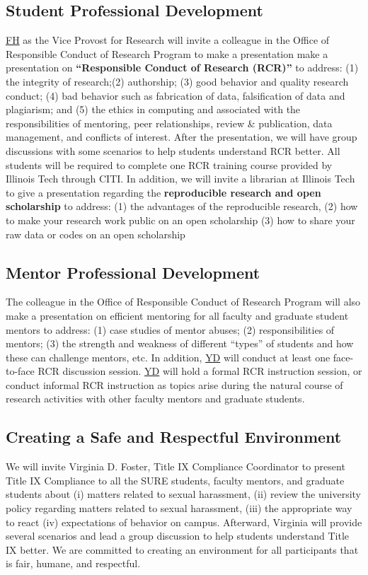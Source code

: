 \documentclass[11pt]{NSFamsart}
\newcommand{\FH}{\hyperlink{FHlink}{FH}\xspace}
\newcommand{\YD}{\hyperlink{YDlink}{YD}\xspace}
\begin{document}
\subsection{Student Professional Development}
\FH as the Vice Provost for Research will invite a colleague in the Office of Responsible Conduct of Research Program to make a presentation make a presentation on
\textbf{“Responsible Conduct of Research (RCR)”} to address: (1) the integrity of research;(2) authorship;  (3) good behavior
and quality research conduct; (4) bad behavior such as fabrication of data, falsification of data and
plagiarism; and (5) the ethics in computing and associated with the responsibilities of mentoring, peer relationships, review
\& publication, data management, and conflicts of interest. After the presentation, we will have group discussions with some scenarios to help students understand RCR better.
All students will be required to complete one RCR training course provided by Illinois Tech through CITI.  In addition, we will invite a librarian at Illinois Tech to give a presentation regarding the \textbf{reproducible research and open scholarship } to address: (1) the advantages of the reproducible research, (2) how to make your research work public on an open scholarship
(3) how to share your raw data or codes on an open scholarship


 \subsection{Mentor Professional Development}
The colleague in the Office of Responsible Conduct of Research Program will also make a presentation on efficient mentoring for all faculty and graduate student mentors to address: (1) case studies
of mentor abuses; (2) responsibilities of mentors; (3) the strength and weakness of different “types” of
students and how these can challenge mentors, etc. In addition, \YD will conduct at least one face-to-face RCR discussion session. \YD will hold a formal RCR instruction session, or conduct informal RCR instruction as topics arise during the natural course of research activities with other faculty mentors and graduate students. 

\subsection{Creating a Safe and Respectful Environment} 
We will invite Virginia D. Foster, Title IX Compliance Coordinator to present Title IX Compliance to all the SURE students, faculty mentors, and graduate students about
(i) matters related to sexual harassment,
(ii) review the university policy regarding matters related to sexual harassment,
(iii) the appropriate way to react
(iv) expectations of behavior on campus. Afterward, Virginia will provide several scenarios and lead a group discussion to help students understand Title IX better. We are committed to creating an environment for all participants that is fair, humane, and respectful.
\end{document}
